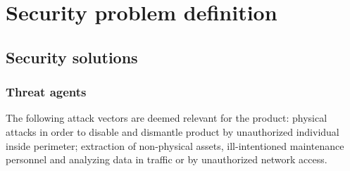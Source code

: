 \documentclass[10pt]{article}
\begin{document}



  \section{Security problem definition}

    \subsection{Security solutions}



     \subsubsection{Threat agents}

      The following attack vectors are deemed relevant for the product:
      physical attacks in order to disable and dismantle product by
      unauthorized individual inside perimeter; extraction of non-physical
      assets, ill-intentioned maintenance personnel and analyzing data in
      traffic or by unauthorized network access.
\end{document}
